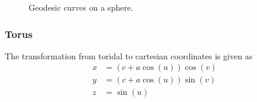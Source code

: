 \documentclass[main.tex]{subfiles}
\begin{document}
\begin{figure}[H]
\hspace{-20mm}
\caption[Geodesic curves on a sphere.]{Geodesic curves on a sphere.}
\end{figure}


\subsubsection{Torus}
The transformation from toridal to cartesian coordinates is given as
\begin{align*}
	x &= (c + a\cos(u))\cos(v)\\
    y &= (c + a\cos(u))\sin(v)\\
    z &= \sin(u)\\
\end{align*}
\end{document}
